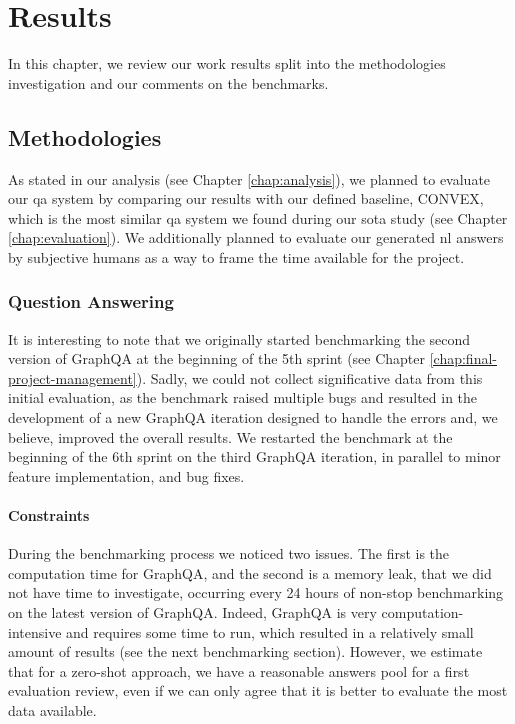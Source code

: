 \chapter{Results}
\label{chap:results}

In this chapter, we review our work results split into the methodologies investigation and our comments on the benchmarks.

\section{Methodologies}
As stated in our analysis (see Chapter \ref{chap:analysis}), we planned to evaluate our \gls{qa} system by comparing our results with our defined baseline, CONVEX, which is the most similar \gls{qa} system we found during our \gls{sota} study (see Chapter \ref{chap:evaluation}). We additionally planned to evaluate our generated \gls{nl} answers by subjective humans as a way to frame the time available for the project.

\subsection{Question Answering}
It is interesting to note that we originally started benchmarking the second version of GraphQA at the beginning of the 5th sprint (see Chapter \ref{chap:final-project-management}). Sadly, we could not collect significative data from this initial evaluation, as the benchmark raised multiple bugs and resulted in the development of a new GraphQA iteration designed to handle the errors and, we believe, improved the overall results. We restarted the benchmark at the beginning of the 6th sprint on the third GraphQA iteration, in parallel to minor feature implementation, and bug fixes.

\subsubsection{Constraints}
During the benchmarking process we noticed two issues. The first is the computation time for GraphQA, and the second is a memory leak, that we did not have time to investigate, occurring every 24 hours of non-stop benchmarking on the latest version of GraphQA. Indeed, GraphQA is very computation-intensive and requires some time to run, which resulted in a relatively small amount of results (see the next benchmarking section). However, we estimate that for a \gls{zero-shot} approach, we have a reasonable answers pool for a first evaluation review, even if we can only agree that it is better to evaluate the most data available. 

